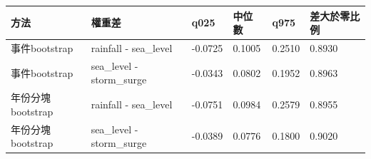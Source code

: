 \begin{tabular}{llllll}
\hline
方法 & 權重差 & q025 & 中位數 & q975 & 差大於零比例 \\
\hline
事件bootstrap & rainfall - sea\_level & -0.0725 & 0.1005 & 0.2510 & 0.8930 \\
事件bootstrap & sea\_level - storm\_surge & -0.0343 & 0.0802 & 0.1952 & 0.8963 \\
年份分塊bootstrap & rainfall - sea\_level & -0.0751 & 0.0984 & 0.2579 & 0.8955 \\
年份分塊bootstrap & sea\_level - storm\_surge & -0.0389 & 0.0776 & 0.1800 & 0.9020 \\
\hline
\end{tabular}